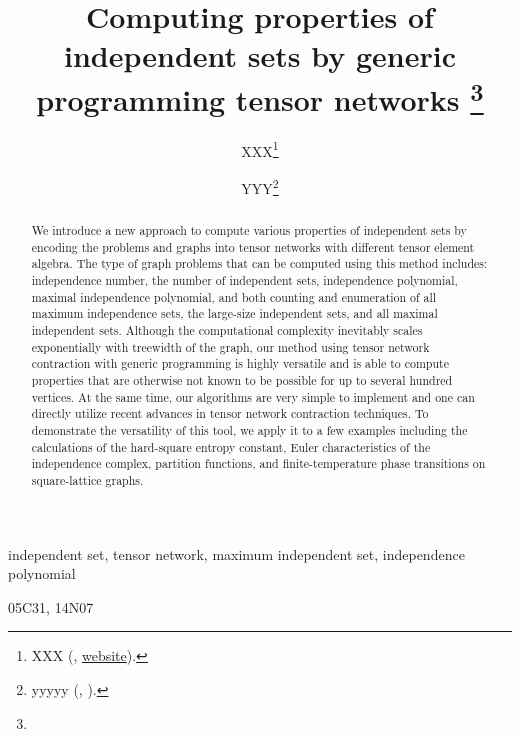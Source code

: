 \documentclass[onefignum, onetabnum]{siamart190516}
\title{Computing properties of independent sets by generic programming tensor networks
\thanks{\funding{...}}
}
\author{XXX\thanks{XXX 
  (\email{email}, \url{website}).}
\and YYY\thanks{yyyyy 
  (\email{yyyy}, \email{email}).}
}
\newcommand{\<}{\langle}
\renewcommand{\>}{\rangle}
\newcounter{example}
\begin{document}
\maketitle

\begin{abstract}
We introduce a new approach to compute various properties of independent sets by encoding the problems and graphs into tensor networks with different tensor element algebra.
The type of graph problems that can be computed using this method includes: independence number, the number of independent sets, independence polynomial, maximal independence polynomial, and both counting and enumeration of all maximum independence sets, the large-size independent sets, and all maximal independent sets.
Although the computational complexity inevitably scales exponentially with treewidth of the graph, our method using tensor network contraction with generic programming is highly versatile and is able to compute properties that are otherwise not known to be possible for up to several hundred vertices.
At the same time, our algorithms are very simple to implement and one can directly utilize recent advances in tensor network contraction techniques.
To demonstrate the versatility of this tool, we apply it to a few examples including the calculations of the hard-square entropy constant, Euler characteristics of the independence complex, partition functions, and finite-temperature phase transitions on square-lattice graphs.
\end{abstract}

\begin{keywords}
independent set, tensor network, maximum independent set, independence polynomial
\end{keywords}

\begin{AMS}
  05C31, 14N07
\end{AMS}
\end{document}
